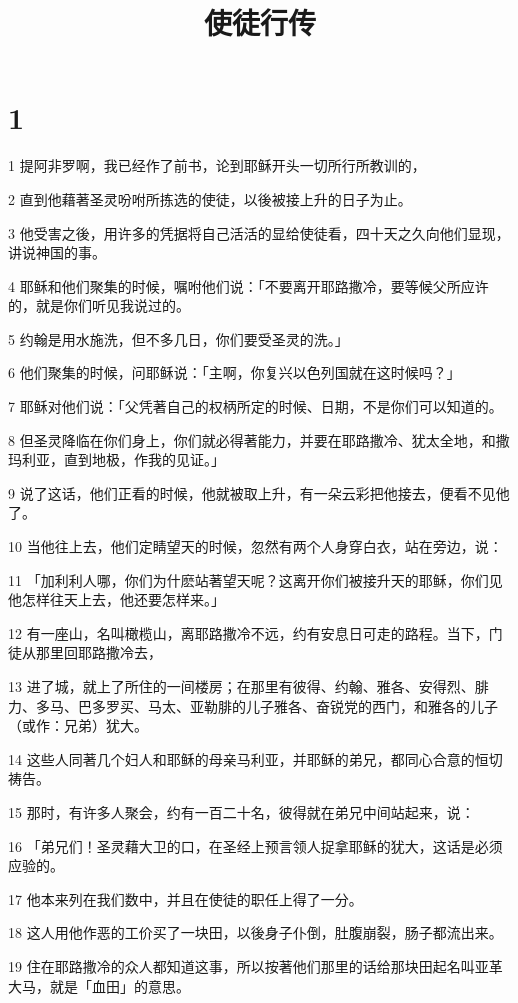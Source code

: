 

\title{使徒行传}


\chapter{1}

\par 1 提阿非罗啊，我已经作了前书，论到耶稣开头一切所行所教训的，
\par 2 直到他藉著圣灵吩咐所拣选的使徒，以後被接上升的日子为止。
\par 3 他受害之後，用许多的凭据将自己活活的显给使徒看，四十天之久向他们显现，讲说神国的事。
\par 4 耶稣和他们聚集的时候，嘱咐他们说：「不要离开耶路撒冷，要等候父所应许的，就是你们听见我说过的。
\par 5 约翰是用水施洗，但不多几日，你们要受圣灵的洗。」
\par 6 他们聚集的时候，问耶稣说：「主啊，你复兴以色列国就在这时候吗？」
\par 7 耶稣对他们说：「父凭著自己的权柄所定的时候、日期，不是你们可以知道的。
\par 8 但圣灵降临在你们身上，你们就必得著能力，并要在耶路撒冷、犹太全地，和撒玛利亚，直到地极，作我的见证。」
\par 9 说了这话，他们正看的时候，他就被取上升，有一朵云彩把他接去，便看不见他了。
\par 10 当他往上去，他们定睛望天的时候，忽然有两个人身穿白衣，站在旁边，说：
\par 11 「加利利人哪，你们为什麽站著望天呢？这离开你们被接升天的耶稣，你们见他怎样往天上去，他还要怎样来。」
\par 12 有一座山，名叫橄榄山，离耶路撒冷不远，约有安息日可走的路程。当下，门徒从那里回耶路撒冷去，
\par 13 进了城，就上了所住的一间楼房；在那里有彼得、约翰、雅各、安得烈、腓力、多马、巴多罗买、马太、亚勒腓的儿子雅各、奋锐党的西门，和雅各的儿子（或作：兄弟）犹大。
\par 14 这些人同著几个妇人和耶稣的母亲马利亚，并耶稣的弟兄，都同心合意的恒切祷告。
\par 15 那时，有许多人聚会，约有一百二十名，彼得就在弟兄中间站起来，说：
\par 16 「弟兄们！圣灵藉大卫的口，在圣经上预言领人捉拿耶稣的犹大，这话是必须应验的。
\par 17 他本来列在我们数中，并且在使徒的职任上得了一分。
\par 18 这人用他作恶的工价买了一块田，以後身子仆倒，肚腹崩裂，肠子都流出来。
\par 19 住在耶路撒冷的众人都知道这事，所以按著他们那里的话给那块田起名叫亚革大马，就是「血田」的意思。
